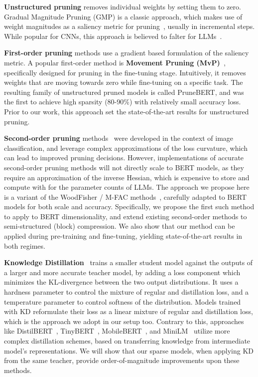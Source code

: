 \documentclass[11pt]{article}
\begin{document}
\noindent\textbf{Unstructured pruning} removes individual weights by setting them to zero.
Gradual Magnitude Pruning (GMP) is a classic approach, which makes use of weight magnitudes as a saliency metric for pruning~\cite{Han2015ADN, Gale2019TheSO}, usually in incremental steps. While popular for CNNs, this approach is believed to falter for LLMs~\cite{Xu2021RethinkingNP, Sanh2020MovementPA}.

\noindent\textbf{First-order pruning} methods use a gradient based formulation of the saliency metric. A popular first-order method is \textbf{Movement Pruning (MvP)}~\cite{Sanh2020MovementPA, lagunas21block}, specifically designed for pruning in the fine-tuning stage. Intuitively, it removes weights that are moving towards zero while fine-tuning on a specific task. The resulting family of unstructured pruned models is called PruneBERT, and was the first to achieve high sparsity (80-90\%) with relatively small accuracy loss. 
Prior to our work, this approach set the state-of-the-art results for unstructured pruning. 

\noindent\textbf{Second-order pruning} methods~\cite{LeCun1989OptimalBD, hassibi1993second, Singh2020WoodFisherES, Frantar2021EfficientMA} were developed in the context of image classification, and leverage complex approximations of the loss curvature, which can lead to improved pruning decisions. 
However, implementations of accurate second-order pruning methods will not directly scale to BERT models, as they require an approximation of the inverse Hessian, which is expensive to store and compute with for the parameter counts of LLMs.
The approach we propose here is a variant of the WoodFisher / M-FAC methods~\cite{Singh2020WoodFisherES, Frantar2021EfficientMA}, carefully adapted to BERT models for both scale and accuracy. Specifically, we propose the first such method to apply to BERT dimensionality, and extend existing second-order methods to semi-structured (block) compression. We also show that our method can be applied during pre-training and fine-tuning, yielding state-of-the-art results in both regimes.

\noindent\textbf{Knowledge Distillation}~\cite{Hinton2015DistillingTK} trains a smaller student model against the outputs of a larger and more accurate teacher model, by adding a loss component which minimizes the KL-divergence between the two output distributions. It uses a hardness parameter to control the mixture of regular and distillation loss, and a temperature parameter to control softness of the distribution. Models trained with KD reformulate their loss as a linear mixture of regular and distillation loss, which is the approach we adopt in our setup too. Contrary to this, approaches like DistilBERT~\cite{Sanh2019DistilBERTAD}, TinyBERT~\cite{Jiao2020TinyBERTDB}, MobileBERT~\cite{Sun2020MobileBERTAC}, and MiniLM~\cite{Wang2020MiniLMDS} utilize more complex distillation schemes, based on transferring knowledge from intermediate model's representations. We will show that our sparse models, when applying KD from the same teacher, provide order-of-magnitude improvements upon these methods. 
\end{document}

